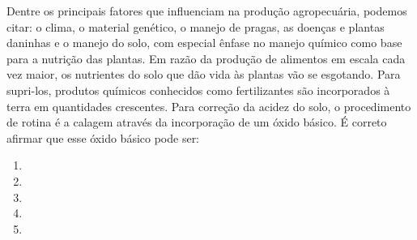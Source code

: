 Dentre os principais fatores que influenciam na produção agropecuária, podemos citar:
o clima, o material genético, o manejo de pragas, as doenças e plantas daninhas e o manejo do solo, com especial ênfase no manejo químico como base para a nutrição das plantas.
Em razão da produção de alimentos em escala cada vez maior, os nutrientes do solo que dão vida às plantas vão se esgotando.
Para supri-los, produtos químicos conhecidos como fertilizantes são incorporados à terra em quantidades crescentes.
Para correção da acidez do solo, o procedimento de rotina é a calagem através da incorporação de um óxido básico.
É correto afirmar que esse óxido básico pode ser:

\begin{enumerate}[label = (\alph*)]
	\item {}
	\item {}
	\item {}
	\item {}
	\item {}
\end{enumerate}
